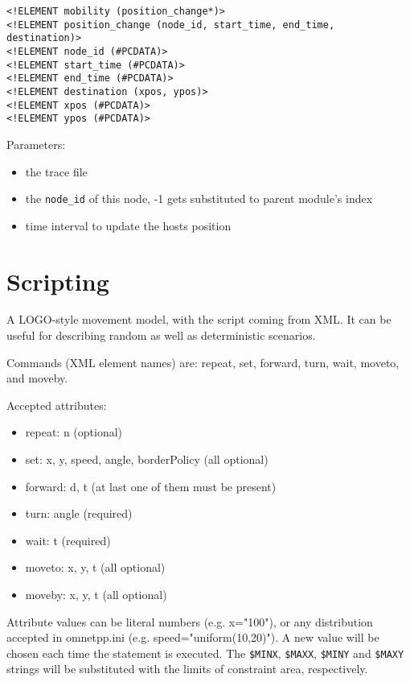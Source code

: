 \begin{description}
\begin{verbatim}
<!ELEMENT mobility (position_change*)>
<!ELEMENT position_change (node_id, start_time, end_time, destination)>
<!ELEMENT node_id (#PCDATA)>
<!ELEMENT start_time (#PCDATA)>
<!ELEMENT end_time (#PCDATA)>
<!ELEMENT destination (xpos, ypos)>
<!ELEMENT xpos (#PCDATA)>
<!ELEMENT ypos (#PCDATA)>
\end{verbatim}


Parameters:

\begin{itemize}
  \item {} the trace file
  \item {} the \verb!node_id! of this node, -1 gets substituted to
  parent module's index
  \item {} time interval to update the hosts position
\end{itemize}
 
\end{description}




\section{Scripting}

A LOGO-style movement model, with the script coming
from XML. It can be useful for describing random as well as deterministic
scenarios.

Commands (XML element names) are: repeat, set, forward, turn, wait,
moveto, and moveby.

Accepted attributes:

\begin{itemize}
  \item repeat: n (optional)
  \item set: x, y, speed, angle, borderPolicy (all optional)
  \item forward: d, t (at last one of them must be present)
  \item turn: angle (required)
  \item wait: t (required)
  \item moveto: x, y, t (all optional)
  \item moveby: x, y, t (all optional)
\end{itemize}

Attribute values can be literal numbers (e.g. x="100"), or any
distribution accepted in omnetpp.ini (e.g. speed="uniform(10,20)").
A new value will be chosen each time the statement is executed.
The \verb!$MINX!, \verb!$MAXX!, \verb!$MINY! and \verb!$MAXY! strings
will be substituted with the limits of constraint area, respectively.

